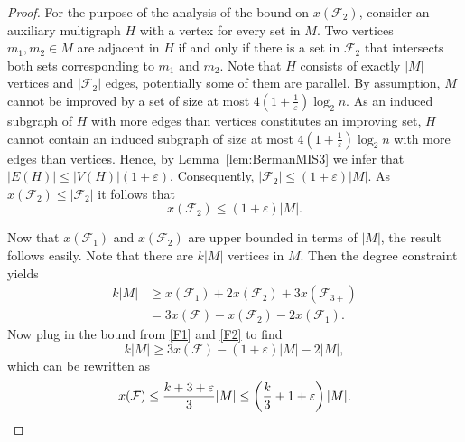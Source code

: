 \begin{proof}
For the purpose of the analysis of the bound on $x(\mathcal{F}_2)$, consider an auxiliary multigraph $H$ with a vertex for every set in $M$. Two vertices $m_1, m_2 \in M$ are adjacent in $H$ if and only if there is a set in $\mathcal{F}_2$ that intersects both sets corresponding to $m_1$ and $m_2$. Note that $H$ consists of exactly $|M|$ vertices and $|\mathcal{F}_2|$ edges, potentially some of them are parallel. By assumption, $M$ cannot be improved by a set of size at most $4 ( 1 + \frac{1}{\varepsilon} ) \log_2 n$. As an induced subgraph of $H$ with more edges than vertices constitutes an improving set, $H$ cannot contain an induced subgraph of size at most $4 ( 1 + \frac{1}{\varepsilon} ) \log_2 n$ with more edges than vertices. Hence, by Lemma~\ref{lem:BermanMIS3} we infer that $|E(H)| \leq |V(H)| (1 + \varepsilon)$. Consequently, $|\mathcal{F}_2| \leq (1 + \varepsilon) |M|$. As $x(\mathcal{F}_2) \leq |\mathcal{F}_2|$ it follows that
%
\begin{equation}\label{F2}
x(\mathcal{F}_2) \leq (1 + \varepsilon) |M|.
\end{equation}

Now that $x(\mathcal{F}_1)$ and $x(\mathcal{F}_2)$ are upper bounded in terms of $|M|$, the result follows easily. Note that there are $k|M|$ vertices in $M$. Then the degree constraint yields
%
\begin{align*}
k|M| & \geq x(\mathcal{F}_1) + 2 x(\mathcal{F}_2) + 3 x(\mathcal{F}_{3+}) \\
     & = 3 x(\mathcal{F}) - x(\mathcal{F}_2) - 2 x(\mathcal{F}_1).
\end{align*}
%
Now plug in the bound from \eqref{F1} and \eqref{F2} to find
%
\begin{equation*}
k|M| \geq 3 x(\mathcal{F}) - (1 + \varepsilon) |M| - 2 |M|,
\end{equation*}
%
which can be rewritten as
%
\begin{equation*}
x(\mathcal{F}) \leq \frac{k + 3 + \varepsilon}{3} |M| \leq \left( \frac{k}{3} + 1 + \varepsilon \right) |M|. \qedhere
\end{equation*}
\end{proof}


